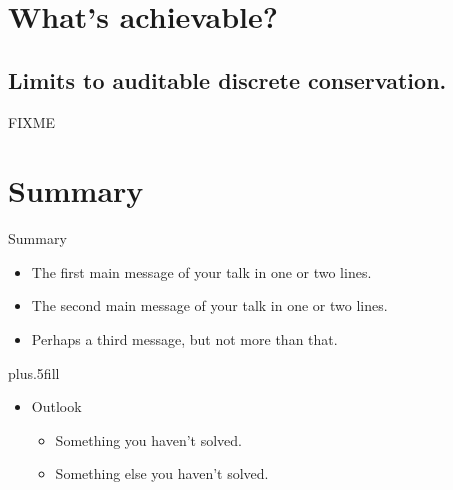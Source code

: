 \documentclass{beamer}
\begin{document}


\section{What's achievable?}

\subsection{Limits to auditable discrete conservation.}

\begin{frame}{FIXME}
\end{frame}


\section*{Summary}

\begin{frame}{Summary}

  \begin{itemize}
  \item
    The \alert{first main message} of your talk in one or two lines.
  \item
    The \alert{second main message} of your talk in one or two lines.
  \item
    Perhaps a \alert{third message}, but not more than that.
  \end{itemize}
  
  \vskip0pt plus.5fill
  \begin{itemize}
  \item
    Outlook
    \begin{itemize}
    \item
      Something you haven't solved.
    \item
      Something else you haven't solved.
    \end{itemize}
  \end{itemize}
\end{frame}
\end{document}
